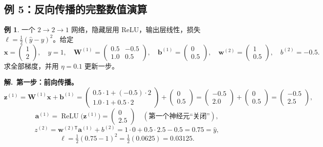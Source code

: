\documentclass[UTF8,a4paper,11pt]{ctexart}
\theoremstyle{definition}
\newtheorem{example}[definition]{例}
\theoremstyle{plain}
\theoremstyle{remark}
\DeclareMathOperator{\ReLU}{ReLU}
\begin{document}
\subsection{例 5：反向传播的完整数值演算}

\begin{example}\label{ex:bp}
一个 $2\to2\to1$ 网络，隐藏层用 ReLU，输出层线性，损失 $\ell=\tfrac12(\hat y-y)^2$。给定
\[
  \bm{x}=\begin{pmatrix}1\\2\end{pmatrix},\quad y=1,\quad
  \bm{W}^{(1)}=\begin{pmatrix}0.5&-0.5\\1.0&0.5\end{pmatrix},\quad
  \bm{b}^{(1)}=\begin{pmatrix}0\\0.5\end{pmatrix},\quad
  \bm{w}^{(2)}=\begin{pmatrix}1\\0.5\end{pmatrix},\quad b^{(2)}=-0.5 .
\]
求全部梯度，并用 $\eta=0.1$ 更新一步。
\end{example}

\noindent\textbf{解.}\ \textbf{第一步：前向传播。}
\[
  \bm{z}^{(1)}=\bm{W}^{(1)}\bm{x}+\bm{b}^{(1)}
  =\begin{pmatrix}0.5\cdot1+(-0.5)\cdot2\\1.0\cdot1+0.5\cdot2\end{pmatrix}+\begin{pmatrix}0\\0.5\end{pmatrix}
  =\begin{pmatrix}-0.5\\2.0\end{pmatrix}+\begin{pmatrix}0\\0.5\end{pmatrix}
  =\begin{pmatrix}-0.5\\2.5\end{pmatrix},
\]
\[
  \bm{a}^{(1)}=\ReLU\big(\bm{z}^{(1)}\big)=\begin{pmatrix}0\\2.5\end{pmatrix}
  \quad(\text{第一个神经元“关闭”}),
\]
\[
  z^{(2)}=\bm{w}^{(2)\mathsf{T}}\bm{a}^{(1)}+b^{(2)}=1\cdot0+0.5\cdot2.5-0.5=0.75=\hat y,
\]
\[
  \ell=\tfrac12(0.75-1)^2=\tfrac12(0.0625)=0.03125 .
\]
\end{document}

